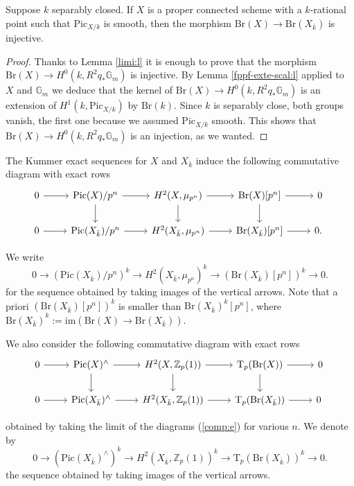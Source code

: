 \documentclass[11pt]{amsart}
\newcommand{\spa}{\medskip}
\newcommand{\Z}{\mathbb{Z}}
\newcommand{\kbar}{{\bar{k}}}
\newcommand{\Zp}{{\mathbb{Z}_{p}}}
\newcommand{\Gm}{\mathbb{G}_m}
\newcommand{\myim}{\mathrm{im}}
\newcommand{\Pic}{\mathrm{Pic}}
\newcommand{\Br}{\mathrm{Br}}
\newcommand{\mupn}{{\mu_{p^n}}}
\newcommand{\Tp}{\mathrm{T}_p}
\begin{document}
\begin{coro}\label{Br-inj:c}Suppose $k$ separably closed. If $X$ is a proper connected scheme with a $k$-rational point such that $\Pic_{X/k}$ is smooth, then the morphism $\Br(X)\to \Br(X_{\kbar})$ is injective.
\end{coro}

\begin{proof}
Thanks to Lemma \ref{limi:l} it is enough to prove that the morphism $\Br(X)\to H^0(k,R^2q_*\Gm)$ is injective. By Lemma \ref{fppf-exte-scal:l} applied to $X$ and $\Gm$ we deduce that the kernel of $\Br(X)\to H^0(k,R^2q_*\Gm)$ is an extension of $H^1(k,\Pic_{X/{k}})$ by $\Br(k)$. Since $k$ is separably close, both groups vanish, the first one because we assumed $\Pic_{X/{k}}$ smooth. This shows that $\Br(X)\to H^0(k,R^2q_*\Gm)$ is an injection, as we wanted.
\end{proof}

\begin{cons}
		The Kummer exact sequences for $X$ and $X_{\kbar}$ induce the following commutative diagram with exact rows
	\begin{equation}\label{comp:e}\begin{tikzcd}
			0\arrow[r] &\Pic(X)/p^n \arrow[d,""]\arrow[r] & H^2_{}(X,\mupn)\arrow[d,""]\arrow[r] & \mathrm{Br}(X)[p^n]\arrow[r]\arrow[d,""] & 0\\
			0\arrow[r]& \Pic(X_\kbar)/p^n \arrow[r]& H^2_{}(X_\kbar,\mupn)\arrow[r]& \mathrm{Br}(X_\kbar)[p^n]\arrow[r]& 0.\
		\end{tikzcd}
	\end{equation}

We write 	\begin{equation}\label{1:e}0\to(\Pic(X_\kbar)/p^n)^k\to H^2(X_\kbar,\mupn)^{k}\to (\Br(X_{\kbar})[p^n])^{k}\to 0.	\end{equation}
for the sequence obtained by taking images of the vertical arrows. Note that a priori $(\Br(X_{\kbar})[p^n])^{k}$ is smaller than $\Br(X_\kbar)^k[p^n]$, where $\Br(X_\kbar)^k:=\myim(\Br(X)\to \Br(X_\kbar))$.

\spa

We also consider the following commutative diagram with exact rows
\begin{equation*}\label{diag:e}\begin{tikzcd}
		0\arrow[r] &\Pic(X)^\wedge \arrow[d,""]\arrow[r] & H^2_{}(X,\Zp(1))\arrow[d,""]\arrow[r] & \Tp(\mathrm{Br}(X))\arrow[r]\arrow[d,""] & 0\\
		0\arrow[r]& \Pic(X_\kbar)^\wedge \arrow[r]& H^2_{}(X_\kbar,\Zp(1))\arrow[r]& \Tp(\mathrm{Br}(X_\kbar))\arrow[r]& 0\
	\end{tikzcd}
\end{equation*}

obtained by taking the limit of the diagrams (\ref{comp:e}) for various $n$. We denote by 	\begin{equation}\label{2:e}
	0\to(\Pic(X_\kbar)^\wedge)^k\to H^2(X_\kbar,\Z_p(1))^{k}\to \Tp(\Br(X_{\kbar}))^{k}\to 0.
\end{equation}
the sequence obtained by taking images of the vertical arrows.
\end{cons}
\end{document}
